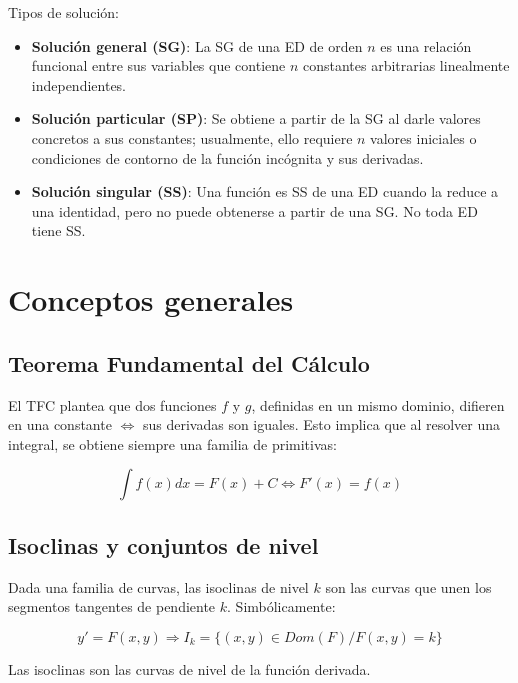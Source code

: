 \documentclass{article}
\begin{document}
Tipos de solución:

\begin{itemize}
\item \textbf{Solución general (SG)}: La SG de una ED de orden $n$ es una relación funcional entre sus variables 
que contiene $n$ constantes arbitrarias linealmente independientes.

\item \textbf{Solución particular (SP)}: Se obtiene a partir de la SG al darle valores concretos a sus constantes; usualmente, ello requiere $n$ valores iniciales o condiciones de contorno de la función incógnita y sus derivadas.

\item \textbf{Solución singular (SS)}: Una función es SS de una ED cuando la reduce a una identidad, pero no puede obtenerse a partir de una SG. No toda ED tiene SS.
\end{itemize}

\section{Conceptos generales}

\subsection{Teorema Fundamental del Cálculo}

El TFC plantea que dos funciones $f$ y $g$, definidas en un mismo dominio, difieren en una constante $\Leftrightarrow$ sus derivadas son iguales. Esto implica que al resolver una integral, se obtiene siempre una familia de primitivas:

\begin{equation}
\int f(x) dx = F(x) + C \Leftrightarrow F'(x) = f(x)
\end{equation}

\subsection{Isoclinas y conjuntos de nivel}

Dada una familia de curvas, las isoclinas de nivel $k$ son las curvas que unen los segmentos tangentes de pendiente $k$. Simbólicamente:

\begin{equation}
y' = F(x,y) \Rightarrow I_k = \{(x,y) \in Dom(F) / F(x,y) = k\}
\end{equation}

Las isoclinas son las curvas de nivel de la función derivada.
\end{document}
